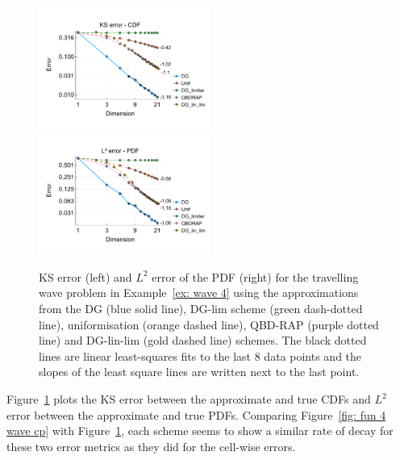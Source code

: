 \begin{example}
\begin{figure}[h]
	\centering
	\includegraphics[width=0.5\textwidth,trim={0.75cm 0.8cm 0.25cm 1.25cm},clip]{chapter6/figs/wave/fun4/meshs_ks_error_formatted.pdf}%
	\includegraphics[width=0.5\textwidth,trim={0.75cm 0.8cm 0.25cm 1.25cm},clip]{chapter6/figs/wave/fun4/meshs_l2_pdf_error_formatted.pdf}
	\caption{KS error (left) and \(L^2\) error of the PDF (right) for the travelling wave problem in Example~\ref{ex: wave 4} using the approximations from the DG (blue solid line), DG-lim scheme (green dash-dotted line), uniformisation (orange dashed line), QBD-RAP (purple dotted line) and DG-lin-lim (gold dashed line) schemes. The black dotted lines are linear least-squares fits to the last 8 data points and the slopes of the least square lines are written next to the last point.} 
	\label{fig: fun 4 wave} 
\end{figure}
Figure~\ref{fig: fun 4 wave} plots the KS error between the approximate and true CDFs and \(L^2\) error between the approximate and true PDFs. Comparing Figure~\ref{fig: fun 4 wave cp} with Figure~\ref{fig: fun 4 wave}, each scheme seems to show a similar rate of decay for these two error metrics as they did for the cell-wise errors. 


\end{example}
